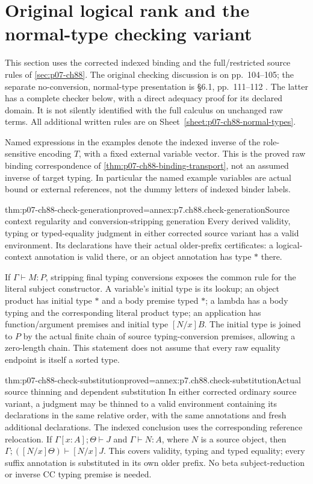 \section{Original logical rank and the normal-type checking variant}
\label{sec:p07-ch88-checking}

This section uses the corrected indexed binding and the full/restricted
source rules of \cref{sec:p07-ch88}. The original checking discussion is
on pp.~104--105; the separate no-conversion, normal-type presentation is
\S6.1, pp.~111--112 \cite{CoquandHuet1988}. The latter has a complete
checker below, with a direct adequacy proof for its declared domain.
It is not silently identified with the full calculus on unchanged raw
terms. All additional written rules are on
Sheet~\ref{sheet:p07-ch88-normal-types}.

Named expressions in the examples denote the indexed inverse of the
role-sensitive encoding \(T\), with a fixed external variable vector.
This is the proved raw binding correspondence of
\cref{thm:p07-ch88-binding-transport}, not an assumed inverse of target
typing. In particular the named example variables are actual bound or
external references, not the dummy letters of indexed binder labels.

\begin{hblemma}{thm:p07-ch88-check-generation}{proved=annex:p7.ch88.check-generation}{Source context regularity and conversion-stripping generation}
Every derived validity, typing or typed-equality judgment in either
corrected source variant has a valid environment. Its declarations have
their actual older-prefix certificates: a logical-context annotation is
valid there, or an object annotation has type \(\ast\) there.

If \(\Gamma\vdash M:P\), stripping final typing conversions exposes
the common rule for the literal subject constructor. A variable's initial
type is its lookup; an object product has initial type \(\ast\) and a
body premise typed \(\ast\); a lambda has a body typing and the
corresponding literal product type; an application has function/argument
premises and initial type \([N/x]B\). The initial type is joined to
\(P\) by the actual finite chain of source typing-conversion premises,
allowing a zero-length chain. This statement does not assume that every
raw equality endpoint is itself a sorted type.
\end{hblemma}

\begin{hbtheorem}{thm:p07-ch88-check-substitution}{proved=annex:p7.ch88.check-substitution}{Actual source thinning and dependent substitution}
In either corrected ordinary source variant, a judgment may be thinned
to a valid environment containing its declarations in the same relative
order, with the same annotations and fresh additional declarations.
The indexed conclusion uses the corresponding reference relocation.
If \(\Gamma[x:A];\Theta\vdash J\) and \(\Gamma\vdash N:A\),
where \(N\) is a source object, then
\(\Gamma;([N/x]\Theta)\vdash[N/x]J\). This covers validity, typing
and typed equality; every suffix annotation is substituted in its own
older prefix. No beta subject-reduction or inverse CC typing premise
is needed.
\end{hbtheorem}

